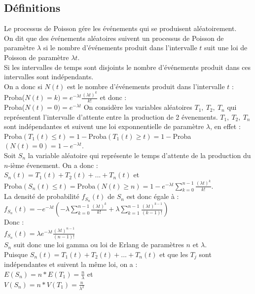 \documentclass[a4paper,11pt]{book}
\begin{document}
\subsection{D\'efinitions}
Le processus de Poisson g\'ere les \'ev\'enements qui se produisent 
al\'eatoirement.\\
On dit que des \'ev\'enements al\'eatoires suivent un processus de Poisson 
de param\`etre $\lambda$ si le nombre d'\'ev\'enements produit dans l'intervalle
$t$ suit une loi de Poisson de param\`etre $\lambda t$.\\
Si les intervalles de temps sont disjoints le nombre d'\'ev\'enements produit 
dans ces intervalles sont ind\'ependants.\\
On a donc si $N(t)$ est le nombre d'\'ev\'enements produit dans l'intervalle 
$t$ : Proba($N(t)=k)=e^{-\lambda t}\frac{{(\lambda t)}^k}{k!}$ et donc :\\
Proba($N(t)=0)=e^{-\lambda t}$
On consid\`ere les variables al\'eatoires $T_1,\ T_2,\ T_n$ qui repr\'esentent 
l'intervalle d'attente entre la production de 2 \'evenements.  $T_1,\ T_2,\ T_n$
sont ind\'ependantes et suivent une loi exponnentielle de param\`etre $\lambda$,
en effet :\\
Proba$(T_1(t)\leq t)=1-$Proba$(T_1(t)\geq t)=1-$Proba$(N(t)=0)=1-e^{-\lambda t}$.\\
Soit $S_n$ la variable al\'eatoire qui repr\'esente le temps d'attente de la 
production du $n$-i\`eme \'evenement. On a donc :\\
$S_n(t)=T_1(t)+T_2(t)+...+ T_n(t)$ et\\
Proba$(S_n(t)\leq t)=$Proba$\displaystyle (N(t)\geq n)=1-e^{-\lambda t}\sum_{k=0}^{n-1}\frac{{(\lambda t)}^k}{k!}$.\\
La densit\'e de probabilit\'e $f_{S_n}(t)$ de $S_n$ est donc \'egale \`a :\\
$\displaystyle f_{S_n}(t)=-e^{-\lambda t}(-\lambda \sum_{k=0}^{n-1}\frac{{(\lambda t)}^k}{k!}+\lambda \sum_{k=1}^{n-1}\frac{{(\lambda t)}^{k-1}}{(k-1)!})$\\
Donc :\\
$\displaystyle f_{S_n}(t)=\lambda e^{-\lambda t}\frac{{(\lambda t)}^{n-1}}{(n-1)!}$ \\
$S_n$ suit donc une loi gamma ou loi de Erlang de param\`etres $n$ et 
$\lambda$.\\
Puisque $S_n(t)=T_1(t)+T_2(t)+...+ T_n(t)$ et que les $T_j$ sont ind\'ependantes
et suivent la m\^eme loi, on a :\\
$\displaystyle E(S_n)=n*E(T_1)=\frac{n}{\lambda}$ et \\
$\displaystyle V(S_n)=n*V(T_1)=\frac{n}{\lambda^2}$ 
\end{document}
